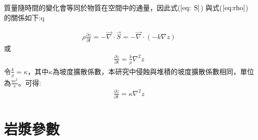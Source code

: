 質量隨時間的變化會等同於物質在空間中的通量，因此式($\ref{eq: S}$) 與式($\ref{eq:rho}$) 的關係如下:q 

\begin{align}
\rho\frac{\partial z}{\partial t} = -\vec\nabla\cdot \vec S = -\vec\nabla \cdot (-k\nabla z)\label{eq:erosion2}
\end{align}
或
\begin{align}
\frac{\partial z}{\partial t} = \frac{k}{\rho}\nabla^2 z\label{eq:erosion3}
\end{align}
令$\frac{k}{\rho}=\kappa$，其中$\kappa$為坡度擴散係數，本研究中侵蝕與堆積的坡度擴散係數相同，單位為$\frac{m^2}{s}$。可得:
\begin{align}
\frac{\partial z}{\partial t} = \kappa\nabla^2 z\label{eq:erosion4}
\end{align}

\section{岩漿參數}
